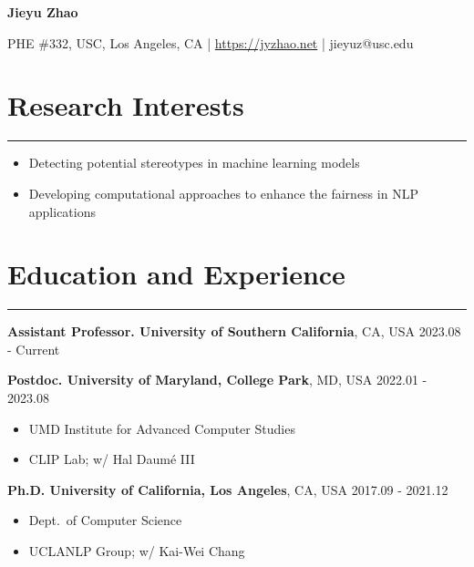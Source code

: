 \documentclass[11pt, a4paper]{article}
\newcommand{\hr}{\hrule\vspace{0.5em}}
\begin{document}
\thispagestyle{fancy}	

\begin{center}
	{\large \bf Jieyu Zhao}
\end{center}
\begin{center}
	{PHE \#332, USC, Los Angeles, CA | \url{https://jyzhao.net} | {jieyuz@usc.edu}}
\end{center}

\section*{Research Interests}
\hr
\begin{itemize}
\item Detecting potential stereotypes in machine learning models
\item Developing computational approaches to enhance the fairness in NLP applications
\end{itemize}


\section*{Education and Experience}
\hr
\textbf{Assistant Professor. University of Southern California}, CA, USA \hfill{2023.08 - Current}

\textbf{Postdoc. University of Maryland, College Park}, MD, USA \hfill{2022.01 - 2023.08}
 \begin{itemize}[leftmargin=20pt]
	\item[] UMD Institute for Advanced Computer Studies
 \item[] CLIP Lab; w/ Hal Daum\'e III
\end{itemize}

\textbf{Ph.D. University of California, Los Angeles}, CA, USA \hfill {2017.09 - 2021.12}
     \begin{itemize}[leftmargin=20pt]
    	\item[] Dept.~of Computer Science
     \item[] UCLANLP Group; w/ Kai-Wei Chang
    \end{itemize}
\end{document}
